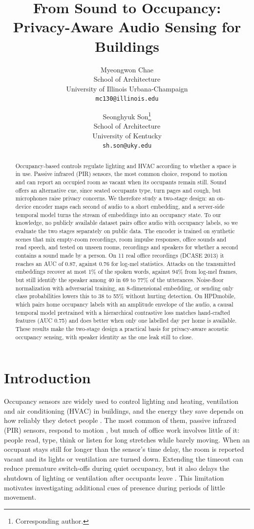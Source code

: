 \documentclass[11pt]{article}
\title{From Sound to Occupancy:\\ Privacy-Aware Audio Sensing for Buildings}
\author{Myeongwon Chae\\
School of Architecture\\
University of Illinois Urbana-Champaign\\
\texttt{mc130@illinois.edu}
\and
Seonghyuk Son\thanks{Corresponding author.}\\
School of Architecture\\
University of Kentucky\\
\texttt{sh.son@uky.edu}}
\date{}
\begin{document}
\maketitle

\begin{abstract}
Occupancy-based controls regulate lighting and HVAC according to whether a space is in use. Passive infrared (PIR) sensors, the most common choice, respond to motion and can report an occupied room as vacant when its occupants remain still. Sound offers an alternative cue, since seated occupants type, turn pages and cough, but microphones raise privacy concerns. We therefore study a two-stage design: an on-device encoder maps each second of audio to a short embedding, and a server-side temporal model turns the stream of embeddings into an occupancy state. To our knowledge, no publicly available dataset pairs office audio with occupancy labels, so we evaluate the two stages separately on public data. The encoder is trained on synthetic scenes that mix empty-room recordings, room impulse responses, office sounds and read speech, and tested on unseen rooms, recordings and speakers for whether a second contains a sound made by a person. On 11 real office recordings (DCASE 2013) it reaches an AUC of 0.87, against 0.76 for log-mel statistics. Attacks on the transmitted embeddings recover at most 1\% of the spoken words, against 94\% from log-mel frames, but still identify the speaker among 40 in 69 to 77\% of the utterances. Noise-floor normalization with adversarial training, an 8-dimensional embedding, or sending only class probabilities lowers this to 38 to 55\% without hurting detection. On HPDmobile, which pairs home occupancy labels with an amplitude envelope of the audio, a causal temporal model pretrained with a hierarchical contrastive loss matches hand-crafted features (AUC 0.75) and does better when only one labelled day per home is available. These results make the two-stage design a practical basis for privacy-aware acoustic occupancy sensing, with speaker identity as the one leak still to close.
\end{abstract}

\section{Introduction}

Occupancy sensors are widely used to control lighting and heating, ventilation and air conditioning (HVAC) in buildings, and the energy they save depends on how reliably they detect people \citep{guo2010lighting}. The most common of them, passive infrared (PIR) sensors, respond to motion \citep{shokrollahi2024pir}, but much of office work involves little of it: people read, type, think or listen for long stretches while barely moving. When an occupant stays still for longer than the sensor's time delay, the room is reported vacant and its lights or ventilation are turned down. Extending the timeout can reduce premature switch-offs during quiet occupancy, but it also delays the shutdown of lighting or ventilation after occupants leave \citep{guo2010lighting}. This limitation motivates investigating additional cues of presence during periods of little movement.
\end{document}
